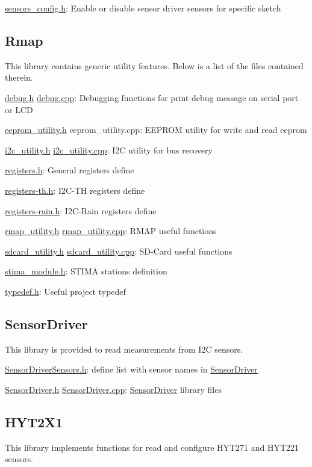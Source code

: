 \hyperlink{sensors__config_8h}{sensors\+\_\+config.\+h}\+: Enable or disable sensor driver sensors for specific sketch\hypertarget{index_rmap}{}\subsection{Rmap}\label{index_rmap}
This library contains generic utility features. Below is a list of the files contained therein.

\hyperlink{debug_8h}{debug.\+h} \hyperlink{debug_8cpp}{debug.\+cpp}\+: Debugging functions for print debug message on serial port or L\+CD

\hyperlink{eeprom__utility_8h}{eeprom\+\_\+utility.\+h} eeprom\+\_\+utility.\+cpp\+: E\+E\+P\+R\+OM utility for write and read eeprom

\hyperlink{i2c__utility_8h}{i2c\+\_\+utility.\+h} \hyperlink{i2c__utility_8cpp}{i2c\+\_\+utility.\+cpp}\+: I2C utility for bus recovery

\hyperlink{registers_8h}{registers.\+h}\+: General register\textquotesingle{}s define

\hyperlink{registers-th_8h}{registers-\/th.\+h}\+: I2\+C-\/\+TH register\textquotesingle{}s define

\hyperlink{registers-rain_8h}{registers-\/rain.\+h}\+: I2\+C-\/\+Rain register\textquotesingle{}s define

\hyperlink{rmap__utility_8h}{rmap\+\_\+utility.\+h} \hyperlink{rmap__utility_8cpp}{rmap\+\_\+utility.\+cpp}\+: R\+M\+AP useful functions

\hyperlink{sdcard__utility_8h}{sdcard\+\_\+utility.\+h} \hyperlink{sdcard__utility_8cpp}{sdcard\+\_\+utility.\+cpp}\+: S\+D-\/\+Card useful functions

\hyperlink{stima__module_8h}{stima\+\_\+module.\+h}\+: S\+T\+I\+MA station\textquotesingle{}s definition

\hyperlink{typedef_8h}{typedef.\+h}\+: Useful project typedef\hypertarget{index_sensordriver}{}\subsection{Sensor\+Driver}\label{index_sensordriver}
This library is provided to read measurements from I2C sensors.

\hyperlink{SensorDriverSensors_8h}{Sensor\+Driver\+Sensors.\+h}\+: define list with sensor names in \hyperlink{classSensorDriver}{Sensor\+Driver}

\hyperlink{SensorDriver_8h}{Sensor\+Driver.\+h} \hyperlink{SensorDriver_8cpp}{Sensor\+Driver.\+cpp}\+: \hyperlink{classSensorDriver}{Sensor\+Driver} library files\hypertarget{index_hyt2x1}{}\subsection{H\+Y\+T2\+X1}\label{index_hyt2x1}
This library implements functions for read and configure H\+Y\+T271 and H\+Y\+T221 sensors.

